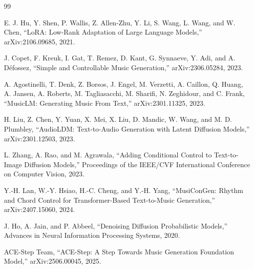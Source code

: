 \documentclass[UTF8,a4paper,zihao=-4,fontset=none]{ctexart}
\begin{document}
\begin{thebibliography}{99}

E. J. Hu, Y. Shen, P. Wallis, Z. Allen-Zhu, Y. Li, S. Wang, L. Wang, and W. Chen,
``LoRA: Low-Rank Adaptation of Large Language Models,''
arXiv:2106.09685, 2021.

J. Copet, F. Kreuk, I. Gat, T. Remez, D. Kant, G. Synnaeve, Y. Adi, and A. Défossez,
``Simple and Controllable Music Generation,''
arXiv:2306.05284, 2023.

A. Agostinelli, T. Denk, Z. Borsos, J. Engel, M. Verzetti, A. Caillon, Q. Huang, A. Jansen, A. Roberts, M. Tagliasacchi, M. Sharifi, N. Zeghidour, and C. Frank,
``MusicLM: Generating Music From Text,''
arXiv:2301.11325, 2023.

H. Liu, Z. Chen, Y. Yuan, X. Mei, X. Liu, D. Mandic, W. Wang, and M. D. Plumbley,
``AudioLDM: Text-to-Audio Generation with Latent Diffusion Models,''
arXiv:2301.12503, 2023.

L. Zhang, A. Rao, and M. Agrawala,
``Adding Conditional Control to Text-to-Image Diffusion Models,''
Proceedings of the IEEE/CVF International Conference on Computer Vision, 2023.

Y.-H. Lan, W.-Y. Hsiao, H.-C. Cheng, and Y.-H. Yang,
``MusiConGen: Rhythm and Chord Control for Transformer-Based Text-to-Music Generation,''
arXiv:2407.15060, 2024.

J. Ho, A. Jain, and P. Abbeel,
``Denoising Diffusion Probabilistic Models,''
Advances in Neural Information Processing Systems, 2020.

ACE-Step Team,
``ACE-Step: A Step Towards Music Generation Foundation Model,''
arXiv:2506.00045, 2025.

\end{thebibliography}
\end{document}
